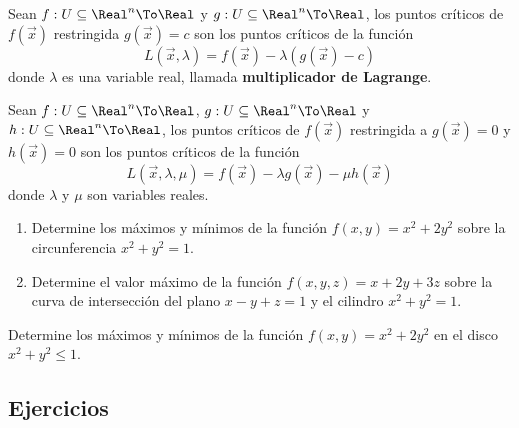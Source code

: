 
\begin{frame}
  \begin{thm}
    Sean $f:U\subseteq\Real^n\To\Real$ y $g:U\subseteq\Real^n\To\Real$, los puntos críticos de $f(\vec{x})$ restringida $g(\vec{x})=c$ son los puntos críticos de la función
      $$L(\vec{x},\lambda)=f(\vec{x})-\lambda(g(\vec{x})-c)$$
    donde $\lambda$ es una variable real, llamada \textnormal{\textbf{multiplicador de Lagrange}}.
  \end{thm}
\end{frame}

\begin{frame}
  \begin{thm}
    Sean $f:U\subseteq\Real^n\To\Real$, $g:U\subseteq\Real^n\To\Real$ y $h:U\subseteq\Real^n\To\Real$, los puntos críticos de $f(\vec{x})$ restringida a $g(\vec{x})=0$ y $h(\vec{x})=0$ son los puntos críticos de la función
      $$L(\vec{x},\lambda,\mu)=f(\vec{x})-\lambda g(\vec{x})-\mu h(\vec{x})$$
      donde $\lambda$ y $\mu$ son variables reales.
  \end{thm}
\end{frame}

\begin{frame}
  \begin{egs}
    \vspace{0.25cm}
    \begin{enumerate}[<+->]
      \item Determine los máximos y mínimos de la función $f(x,y)=x^2+2y^2$ sobre la circunferencia $x^2+y^2=1$.\\[0.25cm]
      \item Determine el valor máximo de la función $f(x,y,z) = x+2y+3z$ sobre la curva de intersección del plano $x-y+z = 1$ y el cilindro $x^2+y^2 = 1$.
    \end{enumerate}
  \end{egs}
\end{frame}

\begin{frame}
  \begin{eg}
    Determine los máximos y mínimos de la función $f(x,y)=x^2+2y^2$ en el disco $x^2+y^2\leq 1$.
  \end{eg}
\end{frame}

\subsection{Ejercicios}
\begin{frame}
\subsectionpage
\end{frame}

